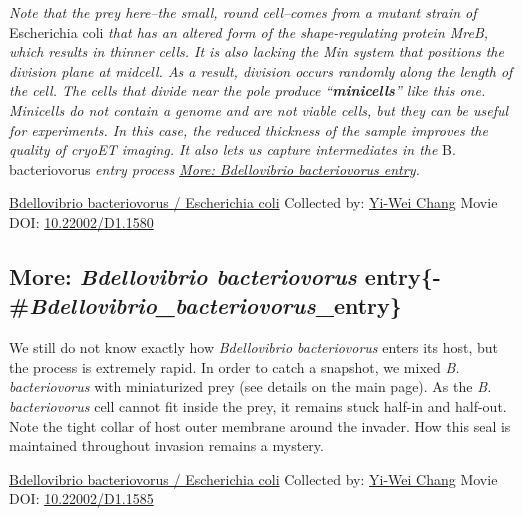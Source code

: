 \documentclass[]{tufte-book}
\begin{document}
\emph{Note that the prey here--the small, round cell--comes from a mutant strain of} Escherichia coli \emph{that has an altered form of the shape-regulating protein MreB, which results in thinner cells. It is also lacking the Min system that positions the division plane at midcell. As a result, division occurs randomly along the length of the cell. The cells that divide near the pole produce ``\textbf{minicells}'' like this one. Minicells do not contain a genome and are not viable cells, but they can be useful for experiments. In this case, the reduced thickness of the sample improves the quality of cryoET imaging. It also lets us capture intermediates in the} B. bacteriovorus \emph{entry process \protect\hyperlink{}{More: Bdellovibrio bacteriovorus entry}.}



\hypertarget{htmlwidget-117b696b056abb020c3d}{}

\label{fig:9-10}\protect\hyperlink{tree}{Bdellovibrio bacteriovorus / Escherichia coli} Collected by: \protect\hyperlink{yi-wei_chang}{Yi-Wei Chang} Movie DOI: \href{https://doi.org/10.22002/D1.1580}{10.22002/D1.1580}

\hypertarget{more-bdellovibrio-bacteriovorus-entry-bdellovibrio_bacteriovorus_entry}{%
\subsection{\texorpdfstring{More: \emph{Bdellovibrio bacteriovorus} entry\{-\#\emph{Bdellovibrio\_bacteriovorus}\_entry\}}{More: Bdellovibrio bacteriovorus entry\{-\#Bdellovibrio\_bacteriovorus\_entry\}}}\label{more-bdellovibrio-bacteriovorus-entry-bdellovibrio_bacteriovorus_entry}}

We still do not know exactly how \emph{Bdellovibrio bacteriovorus} enters its host, but the process is extremely rapid. In order to catch a snapshot, we mixed \emph{B. bacteriovorus} with miniaturized prey (see details on the main page). As the \emph{B. bacteriovorus} cell cannot fit inside the prey, it remains stuck half-in and half-out. Note the tight collar of host outer membrane around the invader. How this seal is maintained throughout invasion remains a mystery.



\hypertarget{htmlwidget-a34034e755b5dca6fcc5}{}

\label{fig:9-10a}\protect\hyperlink{tree}{Bdellovibrio bacteriovorus / Escherichia coli} Collected by: \protect\hyperlink{yi-wei_chang}{Yi-Wei Chang} Movie DOI: \href{https://doi.org/10.22002/D1.1585}{10.22002/D1.1585}
\end{document}
